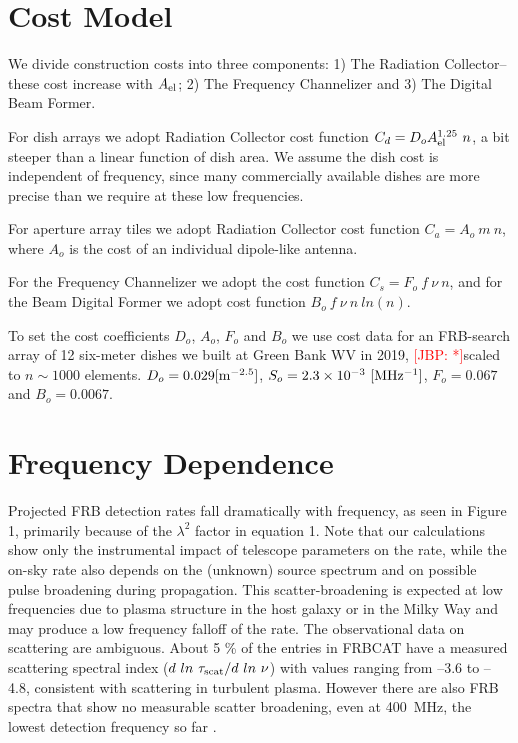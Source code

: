 \documentclass[fleqn,usenatbib]{mnras}
\newcommand{\kibitz}[2]{\ifnum\Comments=1\textcolor{#1}{#2}\fi}
\newcommand{\jbp}[1]{\kibitz{red}      {[JBP: #1]}}
\newcommand{\prs}[1]{\kibitz{darkgreen}     {[PRS: #1]}}
\begin{document}
\section{Cost Model}


We divide construction costs into three components: 1) The Radiation Collector--these cost increase with $A_{\rm{el}}$; 2) The Frequency Channelizer and 3) The Digital Beam Former. 

For dish arrays we adopt Radiation Collector cost function $C_d = D_o A_{\rm{el}}^{1.25} ~n $, a bit steeper than a linear function of dish area.
We assume the dish cost is independent of frequency, since many commercially available dishes are more precise than we require at these low frequencies.


For aperture array tiles we adopt Radiation Collector cost function $C_a = A_o ~m ~n$, where $A_o$ is the cost of an individual dipole-like antenna.

For the Frequency Channelizer we adopt the cost function $C_s = F_o ~f ~\nu ~n$, and for the Beam Digital Former we adopt cost function $B_o ~f ~\nu ~n ~ln(n)$.

To set the cost coefficients $D_o$, $A_o$, $F_o$ and $B_o$ we use cost data for an FRB-search array of 12 six-meter dishes we built at Green Bank WV in 2019, \jbp{*}scaled to $n \sim 1000$ elements. $D_o= 0.029 [\rm{m^{-2.5}}]$, $ S_o = 2.3 \times 10^{-3}\rm{~[MHz^{-1}}]$, $F_o = 0.067 $ and $B_o = 0.0067$. 






\section{Frequency Dependence}

Projected FRB detection rates fall dramatically with frequency, as seen in Figure 1, primarily because of the $\lambda^2$ factor in equation 1.
Note that our calculations show only the instrumental impact of telescope parameters on the rate, while the on-sky rate also depends on the (unknown) source spectrum and on possible pulse broadening during propagation. This scatter-broadening is expected at low frequencies due to plasma structure in the host galaxy or in the Milky Way and may produce a low frequency falloff of the rate. The observational data on scattering are ambiguous. About 5 \% of the entries in FRBCAT \citep{frbcat}  have a measured scattering spectral index ($d ~ln ~\tau_{\rm{scat}}/ d ~ln ~\nu$) with values ranging from --3.6 to --4.8, consistent with scattering in turbulent plasma. However there are also FRB spectra that show no measurable scatter broadening, even at 400~MHz, the lowest detection frequency so far \citep{chime1}. 
\end{document}
